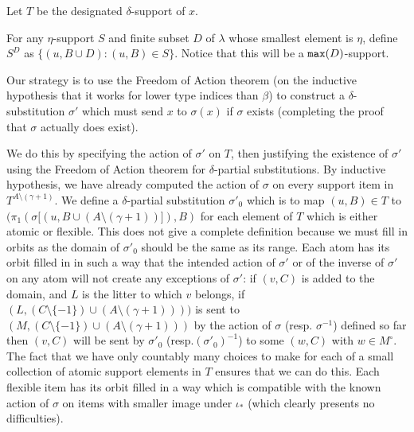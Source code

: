 \documentclass[12pt]{article}
\begin{document}
\begin{enumerate}
Let $T$ be the designated $\delta$-support of $x$.

For any $\eta$-support $S$ and finite subset $D$ of $\lambda$ whose smallest element is $\eta$, define $S^D$ as $\{(u,B \cup D):(u,B) \in S\}$.  Notice that this will be a ${\tt max}(D)$-support.

Our strategy is to use the Freedom of Action theorem (on the inductive hypothesis that it works for lower type indices than $\beta$) to construct a $\delta$-substitution $\sigma'$ which must send $x$ to $\sigma(x)$ if $\sigma$ exists (completing the proof that $\sigma$ actually does exist).

We do this by specifying the action of $\sigma'$ on $T$, then justifying the existence of $\sigma'$ using the Freedom of Action theorem for $\delta$-partial substitutions.  By inductive hypothesis, we have already computed the action of $\sigma$ on every support item in $T^{A\setminus (\gamma+1)}$.
We define a $\delta$-partial substitution $\sigma'_0$ which is to map $(u,B) \in T$ to $(\pi_1(\sigma[(u,B \cup (A \setminus (\gamma+1))]),B)$ for each element of $T$ which is either atomic or flexible.  This does not give a complete definition because we must fill in orbits as the domain
of $\sigma'_0$ should be the same as its range.  Each atom has its orbit filled in in such a way that the intended action of $\sigma'$ or of the inverse of $\sigma'$ on any atom will not create any exceptions of $\sigma'$:  if $(v,C)$ is added to the domain, and $L$ is the litter to which $v$ belongs,
if $(L,(C \setminus \{-1\})\cup (A \setminus (\gamma +1))))$ is sent to $(M,(C \setminus \{-1\}) \cup (A \setminus (\gamma+1)))$ by the action of $\sigma$ (resp. $\sigma^{-1}$) defined so far then $(v,C)$ will be sent by $\sigma'_0$ (resp.$ (\sigma'_0)^{-1}$) to some $(w,C)$ with $w \in M^\circ$.  The fact that we have only countably many choices to make
for each of a small collection of atomic support elements in $T$ ensures that we can do this.  Each flexible item has its orbit filled in a way which is compatible with the known action of $\sigma$ on items with smaller image under $\iota_*$ (which clearly presents no difficulties).


\end{enumerate}
\end{document}
